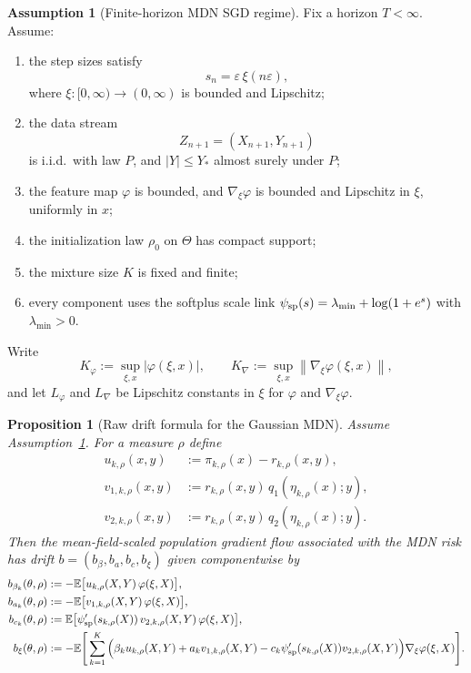 \documentclass[11pt]{article}
\newtheorem{proposition}[theorem]{Proposition}
\theoremstyle{definition}
\newtheorem{assumption}[theorem]{Assumption}
\newcommand{\E}{\mathbb{E}}
\newcommand{\norm}[1]{\left\lVert #1 \right\rVert}
\begin{document}
\begin{assumption}[Finite-horizon MDN SGD regime]
\label{ass:mdn-sgd}
Fix a horizon $T<\infty$. Assume:
\begin{enumerate}[label=(M\arabic*)]
  \item the step sizes satisfy
  \[
    s_n=\varepsilon\,\xi(n\varepsilon),
  \]
  where $\xi:[0,\infty)\to(0,\infty)$ is bounded and Lipschitz;
  \item the data stream
  \[
    Z_{n+1}=(X_{n+1},Y_{n+1})
  \]
  is i.i.d.\ with law $P$, and $|Y|\le Y_\ast$ almost surely under $P$;
  \item the feature map $\varphi$ is bounded, and $\nabla_\xi\varphi$ is bounded
  and Lipschitz in $\xi$, uniformly in $x$;
  \item the initialization law $\rho_0$ on $\Theta$ has compact support;
  \item the mixture size $K$ is fixed and finite;
  \item every component uses the softplus scale link
  $\psi_{\rm sp}(s)=\lambda_{\min}+\log(1+e^s)$ with $\lambda_{\min}>0$.
\end{enumerate}
\end{assumption}

Write
\[
  K_\varphi:=\sup_{\xi,x} |\varphi(\xi,x)|,
  \qquad
  K_\nabla:=\sup_{\xi,x}\norm{\nabla_\xi\varphi(\xi,x)},
\]
and let $L_\varphi$ and $L_\nabla$ be Lipschitz constants in $\xi$ for
$\varphi$ and $\nabla_\xi\varphi$.

\begin{proposition}[Raw drift formula for the Gaussian MDN]
\label{prop:mdn-raw-drift}
Assume Assumption~\ref{ass:mdn-sgd}. For a measure $\rho$ define
\begin{align*}
  u_{k,\rho}(x,y)
  &:=
  \pi_{k,\rho}(x)-r_{k,\rho}(x,y),
  \\
  v_{1,k,\rho}(x,y)
  &:=
  r_{k,\rho}(x,y)\,q_1(\eta_{k,\rho}(x);y),
  \\
  v_{2,k,\rho}(x,y)
  &:=
  r_{k,\rho}(x,y)\,q_2(\eta_{k,\rho}(x);y).
\end{align*}
Then the mean-field-scaled population gradient flow associated with the MDN risk
has drift $b=(b_\beta,b_a,b_c,b_\xi)$ given componentwise by
\begin{align}
  b_{\beta_k}(\theta,\rho)
  &:=
  -
  \E\big[u_{k,\rho}(X,Y)\,\varphi(\xi,X)\big],
  \label{eq:mdn-drift-beta}
  \\
  b_{a_k}(\theta,\rho)
  &:=
  -
  \E\big[v_{1,k,\rho}(X,Y)\,\varphi(\xi,X)\big],
  \label{eq:mdn-drift-a}
  \\
  b_{c_k}(\theta,\rho)
  &:=
  \E\big[\psi_{\rm sp}'(s_{k,\rho}(X))\,v_{2,k,\rho}(X,Y)\,\varphi(\xi,X)\big],
  \label{eq:mdn-drift-c}
  \\
  b_\xi(\theta,\rho)
  &:=
  -
  \E\Bigg[
    \sum_{k=1}^K
    \Big(
      \beta_k u_{k,\rho}(X,Y)
      +
      a_k v_{1,k,\rho}(X,Y)
      -
      c_k\psi_{\rm sp}'(s_{k,\rho}(X))v_{2,k,\rho}(X,Y)
    \Big)\nabla_\xi\varphi(\xi,X)
  \Bigg].
  \label{eq:mdn-drift-xi}
\end{align}
\end{proposition}
\end{document}
